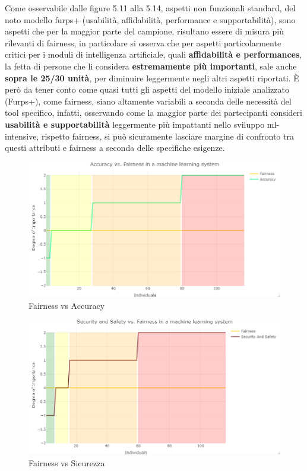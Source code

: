     
    Come osservabile dalle figure 5.11 alla 5.14, aspetti non funzionali standard, del noto modello furps+ (usabilità, affidabilità, performance e supportabilità), sono aspetti che per la maggior parte del campione, risultano essere di misura più rilevanti di fairness, in particolare si osserva che per aspetti particolarmente critici per i moduli di intelligenza artificiale, quali \textbf{affidabilità e performances}, la fetta di persone che li considera \textbf{estremamente più importanti}, sale anche \textbf{sopra le 25/30 unità}, per diminuire leggermente negli altri aspetti riportati. È però da tener conto come quasi tutti gli aspetti del modello iniziale analizzato (Furps+), come fairness, siano altamente variabili a seconda delle necessità del tool specifico, infatti, osservando come la maggior parte dei partecipanti consideri \textbf{usabilità e supportabilità} leggermente più impattanti nello sviluppo ml-intensive, rispetto fairness, si può sicuramente lasciare margine di confronto tra questi attributi e fairness a seconda delle specifiche esigenze.
    \begin{figure}[h!]
        \centering
        \includegraphics[width=1\textwidth]{figure/Analisi/RQ3/5.Accuracy vs. Fairness.png}
        \caption{Fairness vs Accuracy}
    \end{figure}
    
     \begin{figure}[h!]
        \centering
        \includegraphics[width=1\textwidth]{figure/Analisi/RQ3/6.Security and Safety.png}
        \caption{Fairness vs Sicurezza}
    \end{figure}
    
